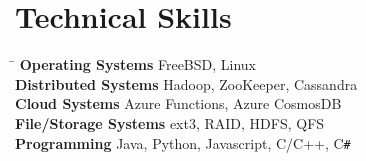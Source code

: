 \documentclass[10pt]{article} %
\begin{document}

\section{Technical Skills}

\begin{tabbing}
\hspace{4cm} \= \kill
\textbf{Operating Systems} \> FreeBSD, Linux \\
\textbf{Distributed Systems} \> Hadoop, ZooKeeper, Cassandra \\
\textbf{Cloud Systems} \> Azure Functions, Azure CosmosDB\\
\textbf{File/Storage Systems} \> ext3, RAID, HDFS, QFS \\
\textbf{Programming} \> Java, Python, Javascript, C/C++, C\texttt{\#}
\end{tabbing}
\end{document}
